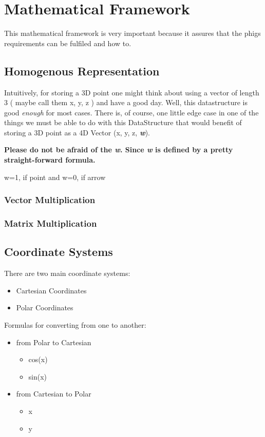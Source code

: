 
\chapter*{Mathematical Framework}

This mathematical framework is very important because it assures that the phigs requirements can be fulfiled and how to.

\section*{Homogenous Representation}

Intuitively, for storing a 3D point one might think about using a vector of length 3 ( maybe call them x, y, z ) and have a good day.
Well, this datastructure is good \emph{enough} for most cases.
There is, of course, one little edge case in one of the things we must be able to do with this DataStructure that would benefit of storing a 3D point as a 4D Vector (x, y, z, \textbf{\emph{w}}).

\textbf{Please do not be afraid of the \emph{w}.  Since \emph{w} is defined by a pretty straight-forward formula.} 

w=1, if point and 
w=0, if arrow


\subsection*{Vector Multiplication}
\subsection*{Matrix Multiplication}

\section*{Coordinate Systems}

There are two main coordinate systems:
\begin{itemize}
  \item Cartesian Coordinates
  \item Polar     Coordinates 
\end{itemize}

Formulas for converting from one to another:
\begin{itemize}
  \item from Polar     to Cartesian
  \begin{itemize}
    \item cos(x)
    \item sin(x)
  \end{itemize}
  \item from Cartesian to Polar
  \begin{itemize}
    \item x
    \item y
  \end{itemize}
\end{itemize}


